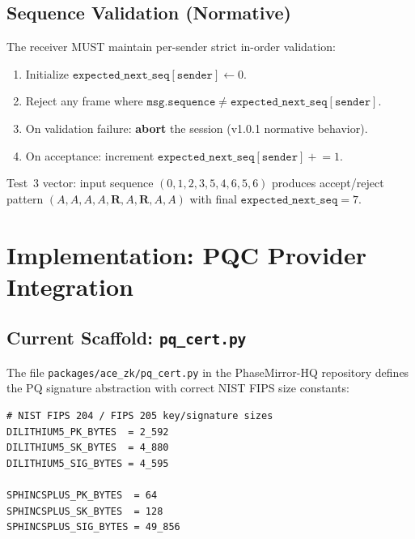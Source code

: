 \documentclass[12pt,letterpaper]{article}
\theoremstyle{plain}
\theoremstyle{definition}
\begin{document}
\subsection{Sequence Validation (Normative)}

The receiver MUST maintain per-sender strict in-order validation:
\begin{enumerate}[leftmargin=2em]
  \item Initialize $\mathtt{expected\_next\_seq}[\mathtt{sender}] \leftarrow 0$.
  \item Reject any frame where
    $\mathtt{msg.sequence} \neq \mathtt{expected\_next\_seq}[\mathtt{sender}]$.
  \item On validation failure: \textbf{abort} the session (v1.0.1 normative
    behavior).
  \item On acceptance: increment
    $\mathtt{expected\_next\_seq}[\mathtt{sender}] \mathrel{+}= 1$.
\end{enumerate}

\noindent Test~3 vector: input sequence $(0,1,2,3,5,4,6,5,6)$ produces
accept/reject pattern $(A,A,A,A,\mathbf{R},A,\mathbf{R},A,A)$ with final
$\mathtt{expected\_next\_seq} = 7$.

\section{Implementation: PQC Provider Integration}
\label{sec:impl}

\subsection{Current Scaffold: \texttt{pq\_cert.py}}

The file \texttt{packages/ace\_zk/pq\_cert.py} in the PhaseMirror-HQ
repository defines the PQ signature abstraction with correct NIST FIPS size
constants:

\begin{lstlisting}[caption={NIST FIPS 204/205 size constants in pq\_cert.py}]
# NIST FIPS 204 / FIPS 205 key/signature sizes
DILITHIUM5_PK_BYTES  = 2_592
DILITHIUM5_SK_BYTES  = 4_880
DILITHIUM5_SIG_BYTES = 4_595

SPHINCSPLUS_PK_BYTES  = 64
SPHINCSPLUS_SK_BYTES  = 128
SPHINCSPLUS_SIG_BYTES = 49_856
\end{lstlisting}
\end{document}
